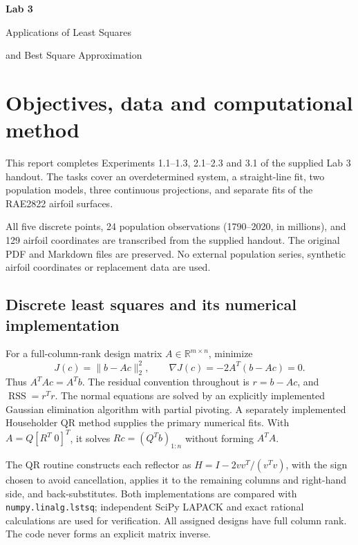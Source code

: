 \documentclass[11pt,a4paper]{article}
\newcommand{\RSS}{\operatorname{RSS}}
\newcommand{\R}{\mathbb{R}}
\begin{document}
\begin{titlepage}
\centering
\vspace*{45mm}
{\Huge\bfseries Lab 3\par}
\vspace{10mm}
{\LARGE Applications of Least Squares\par}
\vspace{4mm}
{\LARGE and Best Square Approximation\par}
\end{titlepage}
\fontsize{10}{12}\selectfont

\section{Objectives, data and computational method}
This report completes Experiments 1.1--1.3, 2.1--2.3 and 3.1 of the supplied Lab 3 handout. The tasks cover an overdetermined system, a straight-line fit, two population models, three continuous projections, and separate fits of the RAE2822 airfoil surfaces.

All five discrete points, 24 population observations (1790--2020, in millions), and 129 airfoil coordinates are transcribed from the supplied handout. The original PDF and Markdown files are preserved. No external population series, synthetic airfoil coordinates or replacement data are used.

\subsection{Discrete least squares and its numerical implementation}
For a full-column-rank design matrix $A\in\R^{m\times n}$, minimize
\[
J(c)=\|b-Ac\|_2^2,\qquad
\nabla J(c)=-2A^T(b-Ac)=0.
\]
Thus $A^TAc=A^Tb$. The residual convention throughout is $r=b-Ac$, and $\RSS=r^Tr$. The normal equations are solved by an explicitly implemented Gaussian elimination algorithm with partial pivoting. A separately implemented Householder QR method supplies the primary numerical fits. With $A=Q[R^T\;0]^T$, it solves $Rc=(Q^Tb)_{1:n}$ without forming $A^TA$.

The QR routine constructs each reflector as $H=I-2vv^T/(v^Tv)$, with the sign chosen to avoid cancellation, applies it to the remaining columns and right-hand side, and back-substitutes. Both implementations are compared with \texttt{numpy.linalg.lstsq}; independent SciPy LAPACK and exact rational calculations are used for verification. All assigned designs have full column rank. The code never forms an explicit matrix inverse.
\end{document}
